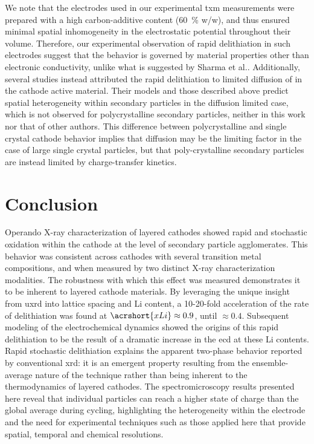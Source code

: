 \documentclass{article}
\begin{document}
We note that the electrodes used in our experimental \gls{txm}
measurements were prepared with a high carbon-additive content
(\SI{60}{\percent} w/w), and thus ensured minimal spatial
inhomogeneity in the electrostatic potential throughout their
volume. Therefore, our experimental observation of rapid delithiation
in such electrodes suggest that the behavior is governed by material
properties other than electronic conductivity, unlike what is
suggested by Sharma et al.\cite{zhao2022}. Additionally, several
studies instead attributed the rapid delithiation to limited diffusion
of  in the cathode active material\cite{rao2021,
  wang2020-6}. Their models and those described above predict spatial
heterogeneity within secondary particles in the diffusion limited
case\cite{wang2020-6}, which is not observed for polycrystalline
secondary particles, neither in this work nor that of other
authors\cite{chueh2021, zhao2022}. This difference between
polycrystalline and single crystal cathode behavior implies that
 diffusion may be the limiting factor in the case of large
single crystal particles, but that poly-crystalline secondary
particles are instead limited by charge-transfer kinetics.
 



\section{Conclusion}

Operando X-ray characterization of layered cathodes showed rapid and
stochastic oxidation within the cathode at the level of secondary
particle agglomerates. This behavior was consistent across cathodes
with several transition metal compositions, and when measured by two
distinct X-ray characterization modalities. The robustness with which
this effect was measured demonstrates it to be inherent to layered
cathode materials. By leveraging the unique insight from \gls{uxrd}
into lattice spacing and Li content, a 10-20-fold acceleration of the
rate of delithiation was found at $\acrshort{xLi} \approx 0.9$, until
$\approx 0.4$. Subsequent modeling of the electrochemical dynamics
showed the origins of this rapid delithiation to be the result of a
dramatic increase in the \gls{ecd} at these Li contents. Rapid
stochastic delithiation explains the apparent two-phase behavior
reported by conventional \gls{xrd}: it is an emergent property
resulting from the ensemble-average nature of the technique rather
than being inherent to the thermodynamics of layered cathodes. The
spectromicroscopy results presented here reveal that individual
particles can reach a higher state of charge than the global average
during cycling, highlighting the heterogeneity within the electrode
and the need for experimental techniques such as those applied here
that provide spatial, temporal and chemical resolutions.
\end{document}
